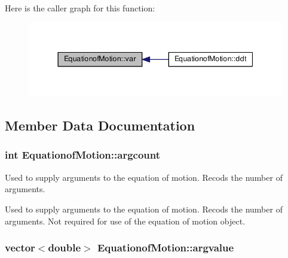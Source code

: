 Here is the caller graph for this function\-:\nopagebreak
\begin{figure}[H]
\begin{center}
\leavevmode
\includegraphics[width=344pt]{class_equationof_motion_ab69511cc5037376cf7da80ce30d9eaab_icgraph}
\end{center}
\end{figure}




\subsection{Member Data Documentation}
\hypertarget{class_equationof_motion_ae3a0a566510eaabba1b78c9cad819153}{
\subsubsection[{argcount}]{\setlength{\rightskip}{0pt plus 5cm}int Equationof\-Motion\-::argcount\hspace{0.3cm}{\ttfamily [protected]}}}\label{class_equationof_motion_ae3a0a566510eaabba1b78c9cad819153}


Used to supply arguments to the equation of motion. Recods the number of arguments. 

Used to supply arguments to the equation of motion. Recods the number of arguments. Not required for use of the equation of motion object. \hypertarget{class_equationof_motion_a5a5b52c663f6f4970d4c99451b8b6bbb}{
\subsubsection[{argvalue}]{\setlength{\rightskip}{0pt plus 5cm}vector$<$double$>$ Equationof\-Motion\-::argvalue\hspace{0.3cm}{\ttfamily [protected]}}}\label{class_equationof_motion_a5a5b52c663f6f4970d4c99451b8b6bbb}


